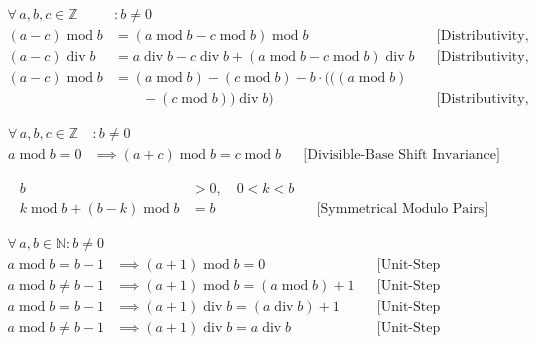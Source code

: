 \begin{equation*}
\begin{aligned}
\forall\, a, b, c \in \mathbb{Z} &: b \neq 0 \\
( a - c ) \operatorname{mod} b
  &= ( a \operatorname{mod} b - c \operatorname{mod} b )
     \operatorname{mod} b &&\text{[Distributivity, Subtraction]} \\
( a - c ) \operatorname{div} b
  &= a \operatorname{div} b - c \operatorname{div} b
     + ( a \operatorname{mod} b - c \operatorname{mod} b )
       \operatorname{div} b &&\text{[Distributivity, Subtraction]} \\
( a - c ) \operatorname{mod} b
  &= (a \operatorname{mod} b) - (c \operatorname{mod} b)
     - b \cdot (((a \operatorname{mod} b) \\
  &\qquad - (c \operatorname{mod} b)) \operatorname{div} b)
  &&\text{[Distributivity, Subtraction]}
\end{aligned}
\end{equation*}

\begin{equation*}
\begin{aligned}
\forall\, a, b, c \in \mathbb{Z} &: b \neq 0 \\
a \operatorname{mod} b = 0
  &\implies ( a + c ) \operatorname{mod} b = c \operatorname{mod} b
  &&\text{[Divisible-Base Shift Invariance]}
\end{aligned}
\end{equation*}

\begin{equation*}
\begin{aligned}
b &> 0,\quad 0 < k < b \\
k \operatorname{mod} b + (b - k) \operatorname{mod} b
  &= b &&\text{[Symmetrical Modulo Pairs]}
\end{aligned}
\end{equation*}

\begin{equation*}
\begin{aligned}
\forall\, a, b \in \mathbb{N} : b \neq 0 \\
a \operatorname{mod} b = b - 1
  &\implies (a + 1) \operatorname{mod} b = 0 &&\text{[Unit-Step Increment]} \\
a \operatorname{mod} b \neq b - 1
  &\implies (a + 1) \operatorname{mod} b = (a \operatorname{mod} b) + 1
  &&\text{[Unit-Step Increment]} \\
a \operatorname{mod} b = b - 1
  &\implies (a + 1) \operatorname{div} b = (a \operatorname{div} b) + 1
  &&\text{[Unit-Step Increment]} \\
a \operatorname{mod} b \neq b - 1
  &\implies (a + 1) \operatorname{div} b = a \operatorname{div} b
  &&\text{[Unit-Step Increment]}
\end{aligned}
\end{equation*}


